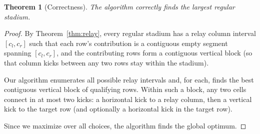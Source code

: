 \documentclass[11pt,a4paper]{article}
\newtheorem{theorem}{Theorem}
\begin{document}
\begin{theorem}[Correctness]
The algorithm correctly finds the largest regular stadium.
\end{theorem}

\begin{proof}
By Theorem~\ref{thm:relay}, every regular stadium has a relay column
interval $[c_l, c_r]$ such that each row's contribution is a contiguous
empty segment spanning $[c_l, c_r]$, and the contributing rows form a
contiguous vertical block (so that column kicks between any two rows
stay within the stadium).

Our algorithm enumerates all possible relay intervals and, for each,
finds the best contiguous vertical block of qualifying rows.  Within
such a block, any two cells connect in at most two kicks: a horizontal
kick to a relay column, then a vertical kick to the target row (and
optionally a horizontal kick in the target row).

Since we maximize over all choices, the algorithm finds the global
optimum.
\end{proof}
\end{document}
